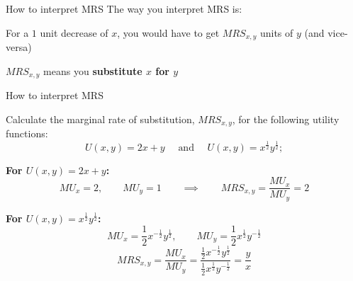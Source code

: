 \documentclass{beamer}
\begin{document}
\begin{frame}{How to interpret MRS}
  The way you interpret MRS is: 
  
  \bigskip
  For a $1$ unit decrease of $x$, you would have to get $MRS_{x,y}$ units of $y$ (and vice-versa)
  

  \bigskip
  $MRS_{x,y}$ means you \textbf{substitute $x$ for $y$}
\end{frame}

\begin{frame}{How to interpret MRS}

  \bigskip
  Calculate the marginal rate of substitution, $MRS_{x,y}$, for the following utility functions:
  $$
    U(x,y) = 2x + y \quad\text{ and }\quad U(x,y) = x^{\frac{1}{2}} y^{\frac{1}{2}};
  $$
\end{frame}

\begin{frame}

  \bigskip
  \textbf{For $U(x,y) = 2x + y$:}
  $$
    MU_x = 2, \qquad MU_y = 1 \qquad \implies \qquad MRS_{x,y} = \frac{MU_x}{MU_y} = 2
  $$

  \bigskip
  \textbf{For $U(x,y) = x^{\frac{1}{2}}y^{\frac{1}{2}}$:}
  $$
    MU_x = \frac{1}{2}x^{-\frac{1}{2}}y^{\frac{1}{2}}, \qquad MU_y = \frac{1}{2}x^{\frac{1}{2}}y^{-\frac{1}{2}}
  $$
  $$
    MRS_{x,y} = \frac{MU_x}{MU_y} = \frac{\frac{1}{2}x^{-\frac{1}{2}}y^{\frac{1}{2}}}{\frac{1}{2}x^{\frac{1}{2}}y^{-\frac{1}{2}}} = \frac{y}{x}
  $$
\end{frame}
\end{document}
